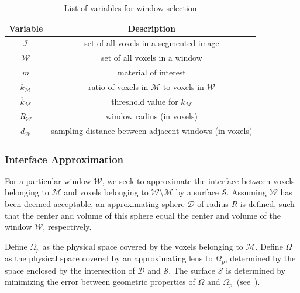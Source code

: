 \begin{table}[htbp!]
 \centering
   \begin{tabular}{|c||c|}
   \hline
   {\textbf{Variable}} & \textbf{Description} \\ \hline \hline
   $\mathcal{I}$ & set of all voxels in a segmented image \\ \hline
   $\mathcal{W}$ & set of all voxels in a window \\ \hline
   $m$ & material of interest \\ \hline
   {$k_{\mathcal{M}}$} & ratio of voxels in $\mathcal{M}$ to voxels in $\mathcal{W}$\\ \hline
   {$\overline{k}_{\mathcal{M}}$ \rule{0mm}{4mm}} & threshold value for $k_{\mathcal{M}}$ \\ \hline 
   $R_{\mathcal{W}}$ & window radius (in voxels) \\ \hline
   $d_{\mathcal{W}}$ & sampling distance between adjacent windows (in voxels) \\ \hline  
\end{tabular}
\caption{List of variables for window selection}
\label{tab:window}
\end{table}

\subsubsection{Interface Approximation}

For a particular window $\mathcal{W}$, we seek to approximate the interface between voxels belonging to $\mathcal{M}$ and voxels belonging to $\mathcal{W} \setminus \mathcal{M}$ by a surface $\mathcal{S}$. Assuming $\mathcal{W}$ has been deemed acceptable, an approximating sphere $\mathcal{D}$ of radius $R$ is defined, such that the center and volume of this sphere equal the center and volume of the window $\mathcal{W}$, respectively.

Define $\Omega_p$ as the physical space covered by the voxels belonging to $\mathcal{M}$. Define $\Omega$ as the physical space covered by an approximating lens to $\Omega_p$, determined by the space enclosed by the intersection of $\mathcal{D}$ and $\mathcal{S}$. The surface $\mathcal{S}$ is determined by minimizing the error between geometric properties of $\Omega$ and $\Omega_p$~(see~).


